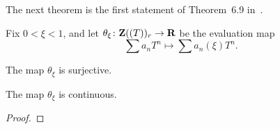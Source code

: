 The next theorem is the first statement of Theorem~6.9 in~\cite{Analytic}.

\begin{definition}
  \label{theta}
  \leanok
  Fix $0<\xi <1$, and let $\theta_{\xi}\colon \mathbf{Z}((T))_r\rightarrow \mathbf{R}$ be the evaluation map
  \[
    \sum a_nT^n\longmapsto \sum a_n(\xi)T^n.
  \]
\end{definition}

\begin{theorem}
  \label{theta.surjective}
  \leanok
  The map $\theta_{\xi}$ is surjective.
\end{theorem}

\begin{theorem}
  \label{theta.continuous}
  \leanok
  The map $\theta_{\xi}$ is continuous.
\end{theorem}

\begin{proof}
  \leanok
\end{proof}

